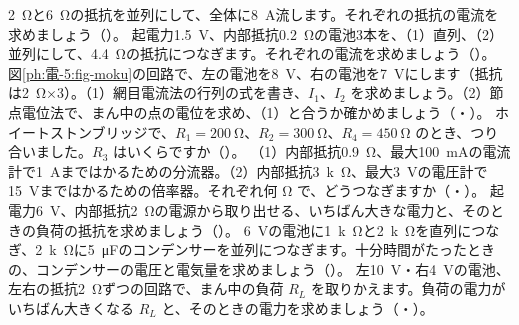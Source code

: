\bkendproblems
{}
\bkproblem \qty{2}{\ohm}と\qty{6}{\ohm}の抵抗を並列にして、全体に\qty{8}{A}流します。それぞれの抵抗の電流を求めましょう（\nobreak{}\nobreak）。
\bkproblem 起電力\qty{1.5}{V}、内部抵抗\qty{0.2}{\ohm}の電池3本を、（1）直列、（2）並列にして、\qty{4.4}{\ohm}の抵抗につなぎます。それぞれの電流を求めましょう（\nobreak{}\nobreak）。
\bkproblem 図\ref{ph:電-5:fig-moku}の回路で、左の電池を\qty{8}{V}、右の電池を\qty{7}{V}にします（抵抗は\qty{2}{\ohm}×3）。（1）網目電流法の行列の式を書き、$I_1$、$I_2$ を求めましょう。（2）節点電位法で、まん中の点の電位を求め、（1）と合うか確かめましょう（\nobreak{}・\nobreak）。
\bkproblem ホイートストンブリッジで、$R_1=\qty{200}{\ohm}$、$R_2=\qty{300}{\ohm}$、$R_4=\qty{450}{\ohm}$ のとき、つり合いました。$R_3$ はいくらですか（\nobreak{}\nobreak）。
\bkproblem （1）内部抵抗\qty{0.9}{\ohm}、最大\qty{100}{mA}の電流計で\qty{1}{A}まではかるための分流器。（2）内部抵抗\qty{3}{k\ohm}、最大\qty{3}{V}の電圧計で\qty{15}{V}まではかるための倍率器。それぞれ何 Ω で、どうつなぎますか（\nobreak{}・\nobreak）。
\bkproblem 起電力\qty{6}{V}、内部抵抗\qty{2}{\ohm}の電源から取り出せる、いちばん大きな電力と、そのときの負荷の抵抗を求めましょう（\nobreak{}\nobreak）。
\bkproblem \qty{6}{V}の電池に\qty{1}{k\ohm}と\qty{2}{k\ohm}を直列につなぎ、\qty{2}{k\ohm}に\qty{5}{\micro F}のコンデンサーを並列につなぎます。十分時間がたったときの、コンデンサーの電圧と電気量を求めましょう（\nobreak{}\nobreak）。
\bkproblem 左\qty{10}{V}・右\qty{4}{V}の電池、左右の抵抗\qty{2}{\ohm}ずつの回路で、まん中の負荷 $R_L$ を取りかえます。負荷の電力がいちばん大きくなる $R_L$ と、そのときの電力を求めましょう（\nobreak{}・\nobreak）。
